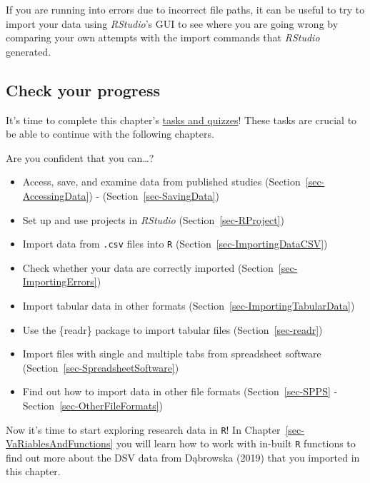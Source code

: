 \documentclass[
  letterpaper,
  DIV=11,
  numbers=noendperiod]{scrreprt}
\providecommand{\tightlist}{%
  \setlength{\itemsep}{0pt}\setlength{\parskip}{0pt}}
\begin{document}
If you are running into errors due to incorrect file paths, it can be
useful to try to import your data using \emph{RStudio}'s GUI to see
where you are going wrong by comparing your own attempts with the import
commands that \emph{RStudio} generated.

\subsection*{Check your progress}\label{check-your-progress-11}

It's time to complete this chapter's
\href{https://elenlefoll.github.io/RstatsTextbook/quizzes/6_quiz.html}{tasks
and quizzes}! These tasks are crucial to be able to continue with the
following chapters.

Are you confident that you can\ldots?

\begin{itemize}
\tightlist
\item[$\square$]
  Access, save, and examine data from published studies
  (Section~\ref{sec-AccessingData}) - (Section~\ref{sec-SavingData})
\item[$\square$]
  Set up and use projects in \emph{RStudio} (Section~\ref{sec-RProject})
\item[$\square$]
  Import data from \texttt{.csv} files into \texttt{R}
  (Section~\ref{sec-ImportingDataCSV})
\item[$\square$]
  Check whether your data are correctly imported
  (Section~\ref{sec-ImportingErrors})
\item[$\square$]
  Import tabular data in other formats
  (Section~\ref{sec-ImportingTabularData})
\item[$\square$]
  Use the \{readr\} package to import tabular files
  (Section~\ref{sec-readr})
\item[$\square$]
  Import files with single and multiple tabs from spreadsheet software
  (Section~\ref{sec-SpreadsheetSoftware})
\item[$\square$]
  Find out how to import data in other file formats
  (Section~\ref{sec-SPPS} - Section~\ref{sec-OtherFileFormats})
\end{itemize}

Now it's time to start exploring research data in \texttt{R}! In
Chapter~\ref{sec-VaRiablesAndFunctions} you will learn how to work with
in-built \texttt{R} functions to find out more about the DSV data from
Dąbrowska (2019) that you imported in this chapter.
\end{document}
